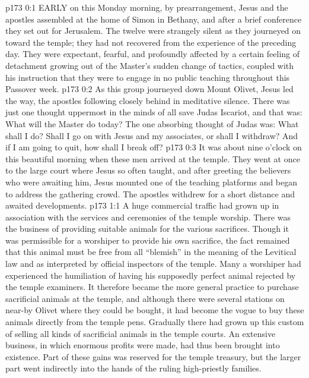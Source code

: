 \vs p173 0:1 EARLY on this Monday morning, by prearrangement, Jesus and the apostles assembled at the home of Simon in Bethany, and after a brief conference they set out for Jerusalem. The twelve were strangely silent as they journeyed on toward the temple; they had not recovered from the experience of the preceding day. They were expectant, fearful, and profoundly affected by a certain feeling of detachment growing out of the Master’s sudden change of tactics, coupled with his instruction that they were to engage in no public teaching throughout this Passover week.
\vs p173 0:2 As this group journeyed down Mount Olivet, Jesus led the way, the apostles following closely behind in meditative silence. There was just one thought uppermost in the minds of all save Judas Iscariot, and that was: What will the Master do today? The one absorbing thought of Judas was: What shall I do? Shall I go on with Jesus and my associates, or shall I withdraw? And if I am going to quit, how shall I break off?
\vs p173 0:3 It was about nine o’clock on this beautiful morning when these men arrived at the temple. They went at once to the large court where Jesus so often taught, and after greeting the believers who were awaiting him, Jesus mounted one of the teaching platforms and began to address the gathering crowd. The apostles withdrew for a short distance and awaited developments.
\vs p173 1:1 A huge commercial traffic had grown up in association with the services and ceremonies of the temple worship. There was the business of providing suitable animals for the various sacrifices. Though it was permissible for a worshiper to provide his own sacrifice, the fact remained that this animal must be free from all “blemish” in the meaning of the Levitical law and as interpreted by official inspectors of the temple. Many a worshiper had experienced the humiliation of having his supposedly perfect animal rejected by the temple examiners. It therefore became the more general practice to purchase sacrificial animals at the temple, and although there were several stations on near\hyp{}by Olivet where they could be bought, it had become the vogue to buy these animals directly from the temple pens. Gradually there had grown up this custom of selling all kinds of sacrificial animals in the temple courts. An extensive business, in which enormous profits were made, had thus been brought into existence. Part of these gains was reserved for the temple treasury, but the larger part went indirectly into the hands of the ruling high\hyp{}priestly families.
